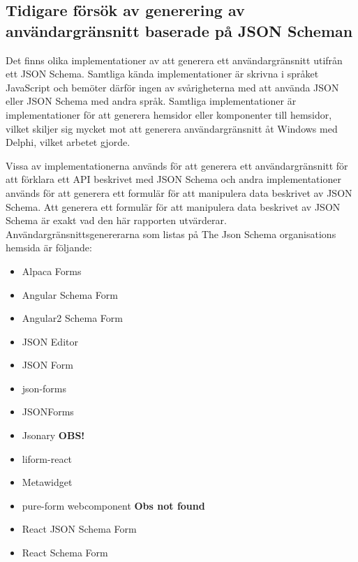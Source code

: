 \subsection{Tidigare försök av generering av användargränsnitt baserade på JSON Scheman}
\label{sec:teori:schema-användningsområden:ui-generering}
Det finns olika implementationer av att generera ett användargränsnitt utifrån ett JSON Schema. Samtliga kända implementationer är skrivna i språket JavaScript och bemöter därför ingen av svårigheterna med att använda JSON eller JSON Schema med andra språk. Samtliga implementationer är implementationer för att generera hemsidor eller komponenter till hemsidor, vilket skiljer sig mycket mot att generera användargränsnitt åt Windows med Delphi, vilket arbetet gjorde.

Vissa av implementationerna används för att generera ett användargränsnitt för att förklara ett API beskrivet med JSON Schema och andra implementationer används för att generera ett formulär för att manipulera data beskrivet av JSON Schema. Att generera ett formulär för att manipulera data beskrivet av JSON Schema är exakt vad den här rapporten utvärderar. Användargränsnittsgenererarna som listas på The Json Schema organisations hemsida är följande:

\begin{itemize}
	\item Alpaca Forms \cite{GitanaSoftwareInc.}
	\item Angular Schema Form \cite{Textalk}
	\item Angular2 Schema Form \cite{MakinaCorpus}
	\item JSON Editor \cite{JeremyDorn}
	\item JSON Form \cite{Joshfire}
	\item json-forms \cite{Brutusin.org}
	\item JSONForms  \cite{EclipseSource}
	\item Jsonary  \textbf{OBS!}
	\item liform-react \cite{NachoMartin}
	\item Metawidget \cite{Metawidget}
	\item pure-form webcomponent \textbf{Obs not found}
	\item React JSON Schema Form \cite{MozillaServices}
	\item React Schema Form \cite{MozillaServices}
\end{itemize}

%
%


